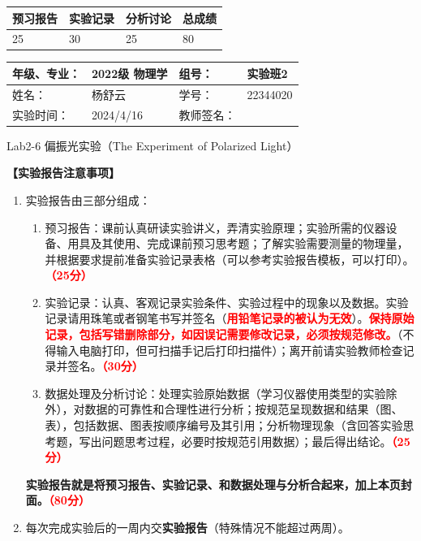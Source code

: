 \documentclass[dvipsnames, svgnames,a4paper,11pt]{article}
\begin{document}
	
	
	
	
	\begin{table}
		\renewcommand\arraystretch{1.7}
		\begin{tabularx}{\textwidth}{
				|X|X|X|X
				|X|X|X|X|}
			\hline
			\multicolumn{2}{|c|}{预习报告}&\multicolumn{2}{|c|}{实验记录}&\multicolumn{2}{|c|}{分析讨论}&\multicolumn{2}{|c|}{总成绩}\\
			\hline
			\LARGE25 & & \LARGE30 & & \LARGE25 & & \LARGE80 & \\
			\hline
		\end{tabularx}
	\end{table}
	
	\begin{table}
		\renewcommand\arraystretch{1.7}
		\begin{tabularx}{\textwidth}{|X|X|X|X|}
			\hline
			年级、专业： & 2022级 物理学 &组号： & 实验班2\\
			\hline
			姓名： & 杨舒云  & 学号： & 22344020\\
			\hline
			实验时间： & 2024/4/16 & 教师签名： & \\
			\hline
		\end{tabularx}
	\end{table}
	
	\begin{center}
		\LARGE Lab2-6 \quad 偏振光实验（The Experiment of Polarized Light）
	\end{center}
	
	
	\textbf{【实验报告注意事项】}
	\begin{enumerate}
		\item 实验报告由三部分组成：
		\begin{enumerate}
			\item 预习报告：课前认真研读实验讲义，弄清实验原理；实验所需的仪器设备、用具及其使用、完成课前预习思考题；了解实验需要测量的物理量，并根据要求提前准备实验记录表格（可以参考实验报告模板，可以打印）。\textcolor{red}{\textbf{（25分）}}
			\item 实验记录：认真、客观记录实验条件、实验过程中的现象以及数据。实验记录请用珠笔或者钢笔书写并签名（\textcolor{red}{\textbf{用铅笔记录的被认为无效}}）。\textcolor{red}{\textbf{保持原始记录，包括写错删除部分，如因误记需要修改记录，必须按规范修改。}}（不得输入电脑打印，但可扫描手记后打印扫描件）；离开前请实验教师检查记录并签名。\textcolor{red}{\textbf{（30分）}}
			\item 数据处理及分析讨论：处理实验原始数据（学习仪器使用类型的实验除外），对数据的可靠性和合理性进行分析；按规范呈现数据和结果（图、表），包括数据、图表按顺序编号及其引用；分析物理现象（含回答实验思考题，写出问题思考过程，必要时按规范引用数据）；最后得出结论。\textcolor{red}{\textbf{（25分）}}
		\end{enumerate}
		\textbf{实验报告就是将预习报告、实验记录、和数据处理与分析合起来，加上本页封面。\textcolor{red}{（80分）}}
		\item 每次完成实验后的一周内交\textbf{实验报告}（特殊情况不能超过两周）。
	\end{enumerate}
	
\end{document}
